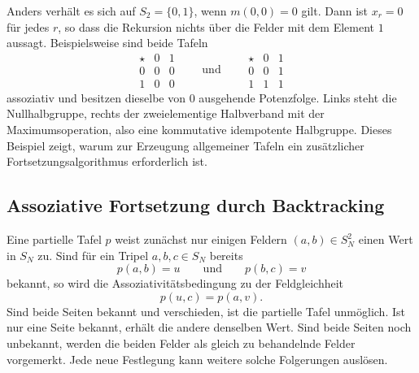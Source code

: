 \documentclass[main.tex]{subfiles}
\begin{document}
Anders verhält es sich auf \(S_2=\{0,1\}\), wenn \(m(0,0)=0\) gilt.  Dann
ist \(x_r=0\) für jedes \(r\), so dass die Rekursion nichts über die Felder
mit dem Element \(1\) aussagt.  Beispielsweise sind beide Tafeln
\[
\begin{array}{c|cc}
\star&0&1\\\hline
0&0&0\\
1&0&0
\end{array}
\qquad\text{und}\qquad
\begin{array}{c|cc}
\star&0&1\\\hline
0&0&1\\
1&1&1
\end{array}
\]
assoziativ und besitzen dieselbe von \(0\) ausgehende Potenzfolge.  Links
steht die Nullhalbgruppe, rechts der zweielementige Halbverband mit der
Maximumsoperation, also eine kommutative idempotente Halbgruppe.  Dieses
Beispiel zeigt, warum zur Erzeugung allgemeiner Tafeln ein zusätzlicher
Fortsetzungsalgorithmus erforderlich ist.


\subsection{Assoziative Fortsetzung durch Backtracking}

Eine partielle Tafel \(p\) weist zunächst nur einigen Feldern
\((a,b)\in S_N^2\) einen Wert in \(S_N\) zu.  Sind für ein Tripel
\(a,b,c\in S_N\) bereits
\[
  p(a,b)=u
  \qquad\text{und}\qquad
  p(b,c)=v
\]
bekannt, so wird die Assoziativitätsbedingung zu der Feldgleichheit
\[
  \boxed{p(u,c)=p(a,v).}
\]
Sind beide Seiten bekannt und verschieden, ist die partielle Tafel
unmöglich.  Ist nur eine Seite bekannt, erhält die andere denselben Wert.
Sind beide Seiten noch unbekannt, werden die beiden Felder als gleich zu
behandelnde Felder vorgemerkt.  Jede neue Festlegung kann weitere solche
Folgerungen auslösen.
\end{document}
